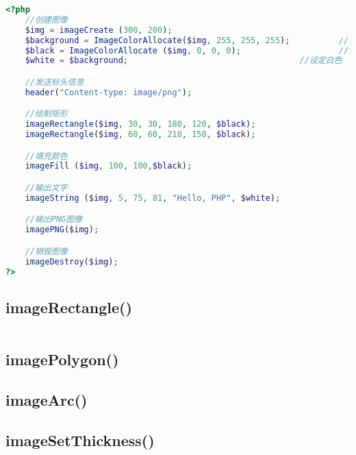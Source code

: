 \begin{lstlisting}[language=PHP]
<?php
	//创建图像
	$img = imageCreate (300, 200);
	$background = ImageColorAllocate($img, 255, 255, 255);			//背景设为白色
	$black = ImageColorAllocate ($img, 0, 0, 0);		  			//设定黑色
	$white = $background;									//设定白色

	//发送标头信息
	header("Content-type: image/png");

	//绘制矩形
	imageRectangle($img, 30, 30, 180, 120, $black);
	imageRectangle($img, 60, 60, 210, 150, $black);

	//填充颜色
	imageFill ($img, 100, 100,$black);

	//输出文字
	imageString ($img, 5, 75, 81, "Hello, PHP", $white);

	//输出PNG图像
	imagePNG($img);

	//销毁图像
	imageDestroy($img);
?>
\end{lstlisting}







\subsection{imageRectangle()}




\begin{lstlisting}[language=PHP]

\end{lstlisting}



\subsection{imagePolygon()}



\subsection{imageArc()}




\subsection{imageSetThickness()}



\begin{lstlisting}[language=PHP]

\end{lstlisting}





